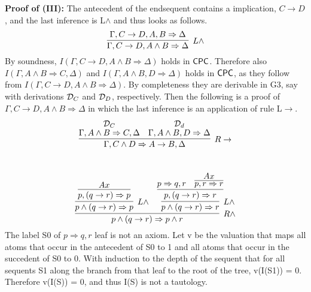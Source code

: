 \documentclass[11pt]{article}
\newcommand{\cpc}{{\sf CPC}}
\newcommand{\Gth}{{\sf G3}}
\newcommand{\cald}{{\cal D}}
\newcommand{\Ga}{\Gamma}
\newcommand{\De}{\Delta}
\newcommand{\imp}{\rightarrow}
\newcommand{\en}{\wedge}
\newcommand{\seq}{\Rightarrow}
\begin{document}
{\bf Proof of (III):} 
The antecedent of the endsequent contains a implication, $C \imp D$, and the last inference is L$\en$ and thus looks as follows. 
\[
 \infer[L \en]
 {\Ga,C \imp D,A \en B \seq \De}
 {\Ga ,C \imp D, A,B \seq \De} 
\]
By soundness, $I(\Ga,C \imp D,A \en B \seq \De)$ holds in $\cpc$. Therefore also 
$I(\Ga , A \en B \seq C,\De)$ and $I(\Ga , A \en B,D \seq \De)$ holds in $\cpc$, as they follow from $I(\Ga,C \imp D,A \en B \seq \De)$. By completeness they are derivable in \Gth, say with derivations $\cald_C$ and $\cald_D$, respectively. Then the following is a proof of $\Ga,C \imp D,A \en B \seq \De$ in which the last inference is an application of rule L$\imp$. 
\[
 \infer[R \imp]{\Ga, C\en D \seq A \imp B,\De}{\deduce[\cald_C]
 {\Ga, A \en B \seq C,\De}
 {} & \deduce[\cald_d]
 {\Ga,A \en B ,D \seq \De}
 {} }
\]


\section{}

\[
\infer[R \en]{p \en (q\imp r) \seq p \en r}{
{\infer[L \en]{p \en (q \imp r)\seq p}
{\infer[]{p,(q \imp r)\seq p}{Ax}}
}&
{\infer[L \en]{p \en (q \imp r)\seq r}
{\infer[]{p,(q \imp r)\seq r}{{p \seq q,r}&
{\infer[]{p,r \seq r}{Ax}}
}}}}
\] 
The label S0 of  $p \seq q,r$ leaf is not an axiom. Let v be
the valuation that maps all atoms that occur in the antecedent of S0 to 1 and
all atoms that occur in the succedent of S0 to 0.
With induction to the depth of the sequent that for all sequents S1 along
the branch from that leaf to the root of the tree, v(I(S1)) = 0. Therefore
v(I(S)) = 0, and thus I(S) is not a tautology. 

\clearpage 
\end{document}
